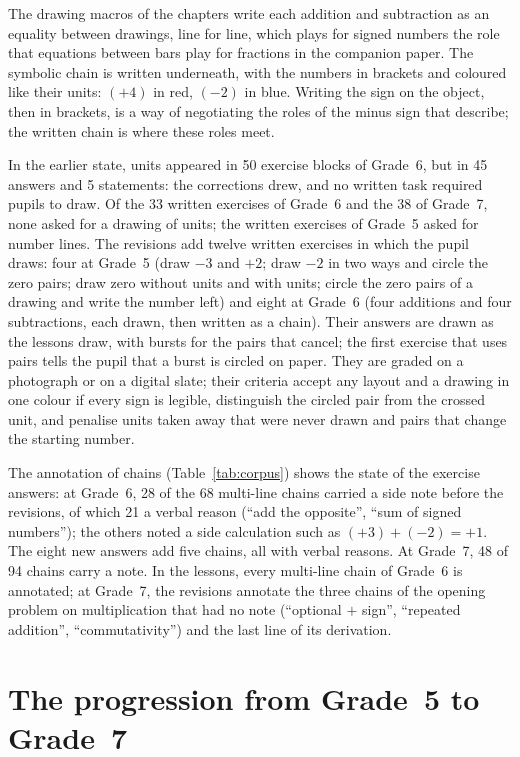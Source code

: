 \documentclass[11pt,a4paper]{article}
\theoremstyle{definition}
\begin{document}
The drawing macros of the chapters write each addition and subtraction as an equality between drawings, line for line, which plays for signed numbers the role that equations between bars play for fractions in the companion paper. The symbolic chain is written underneath, with the numbers in brackets and coloured like their units: $(+4)$ in red, $(-2)$ in blue. Writing the sign on the object, then in brackets, is a way of negotiating the roles of the minus sign that \citet{Vlassis2004,Vlassis2008} describe; the written chain is where these roles meet.

In the earlier state, units appeared in 50 exercise blocks of Grade~6, but in 45 answers and 5 statements: the corrections drew, and no written task required pupils to draw. Of the 33 written exercises of Grade~6 and the 38 of Grade~7, none asked for a drawing of units; the written exercises of Grade~5 asked for number lines. The revisions add twelve written exercises in which the pupil draws: four at Grade~5 (draw $-3$ and $+2$; draw $-2$ in two ways and circle the zero pairs; draw zero without units and with units; circle the zero pairs of a drawing and write the number left) and eight at Grade~6 (four additions and four subtractions, each drawn, then written as a chain). Their answers are drawn as the lessons draw, with bursts for the pairs that cancel; the first exercise that uses pairs tells the pupil that a burst is circled on paper. They are graded on a photograph or on a digital slate; their criteria accept any layout and a drawing in one colour if every sign is legible, distinguish the circled pair from the crossed unit, and penalise units taken away that were never drawn and pairs that change the starting number.

The annotation of chains (Table~\ref{tab:corpus}) shows the state of the exercise answers: at Grade~6, 28 of the 68 multi-line chains carried a side note before the revisions, of which 21 a verbal reason (``add the opposite'', ``sum of signed numbers''); the others noted a side calculation such as $(+3)+(-2)=+1$. The eight new answers add five chains, all with verbal reasons. At Grade~7, 48 of 94 chains carry a note. In the lessons, every multi-line chain of Grade~6 is annotated; at Grade~7, the revisions annotate the three chains of the opening problem on multiplication that had no note (``optional $+$ sign'', ``repeated addition'', ``commutativity'') and the last line of its derivation.

\section{The progression from Grade~5 to Grade~7}\label{sec:progression}
\end{document}
